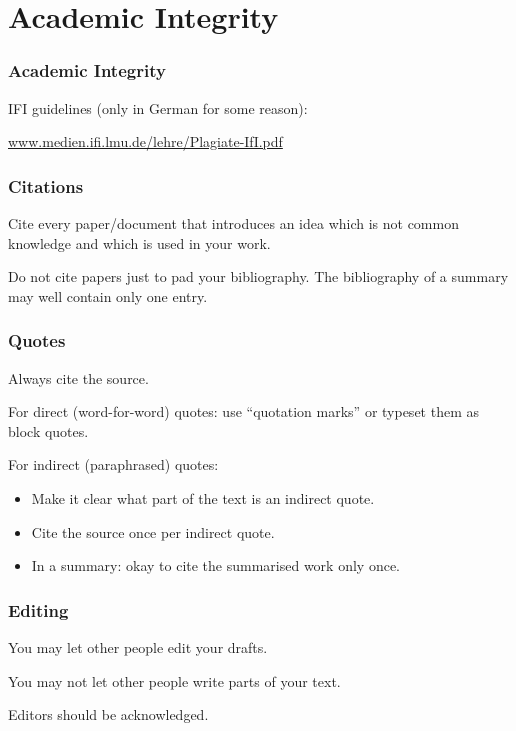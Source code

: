 \section{Academic Integrity}

\begin{frame}
  \frametitle{Academic Integrity}

  IFI guidelines (only in German for some reason):

  \medskip

  \url{www.medien.ifi.lmu.de/lehre/Plagiate-IfI.pdf}
\end{frame}

\begin{frame}
  \frametitle{Citations}

  Cite every paper/document that introduces an idea which is not common knowledge and which is used in your work.

  \medskip
  \pause

  Do not cite papers just to pad your bibliography.
  The bibliography of a summary may well contain only one entry.
\end{frame}

\begin{frame}
  \frametitle{Quotes}

  Always cite the source.

  \medskip
  \pause

  For direct (word-for-word) quotes: use \enquote{quotation marks} or typeset them as block quotes.

  \medskip
  \pause

  For indirect (paraphrased) quotes:
  \begin{itemize}
    \item Make it clear what part of the text is an indirect quote.
    \item Cite the source once per indirect quote.
    \item In a summary: okay to cite the summarised work only once.
  \end{itemize}
\end{frame}

\begin{frame}
  \frametitle{Editing}

  You may let other people edit your drafts.

  \medskip
  \pause

  You may not let other people write parts of your text.

  \medskip
  \pause

  Editors should be acknowledged.
\end{frame}

